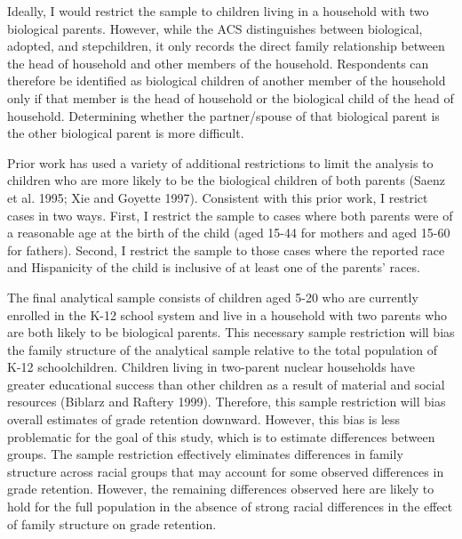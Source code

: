 \documentclass[
  letterpaper,
  DIV=11,
  numbers=noendperiod]{scrartcl}
\begin{document}
Ideally, I would restrict the sample to children living in a household
with two biological parents. However, while the ACS distinguishes
between biological, adopted, and stepchildren, it only records the
direct family relationship between the head of household and other
members of the household. Respondents can therefore be identified as
biological children of another member of the household only if that
member is the head of household or the biological child of the head of
household. Determining whether the partner/spouse of that biological
parent is the other biological parent is more difficult.

Prior work has used a variety of additional restrictions to limit the
analysis to children who are more likely to be the biological children
of both parents (Saenz et al. 1995; Xie and Goyette 1997). Consistent
with this prior work, I restrict cases in two ways. First, I restrict
the sample to cases where both parents were of a reasonable age at the
birth of the child (aged 15-44 for mothers and aged 15-60 for fathers).
Second, I restrict the sample to those cases where the reported race and
Hispanicity of the child is inclusive of at least one of the parents'
races.

The final analytical sample consists of children aged 5-20 who are
currently enrolled in the K-12 school system and live in a household
with two parents who are both likely to be biological parents. This
necessary sample restriction will bias the family structure of the
analytical sample relative to the total population of K-12
schoolchildren. Children living in two-parent nuclear households have
greater educational success than other children as a result of material
and social resources (Biblarz and Raftery 1999). Therefore, this sample
restriction will bias overall estimates of grade retention downward.
However, this bias is less problematic for the goal of this study, which
is to estimate differences between groups. The sample restriction
effectively eliminates differences in family structure across racial
groups that may account for some observed differences in grade
retention. However, the remaining differences observed here are likely
to hold for the full population in the absence of strong racial
differences in the effect of family structure on grade retention.
\end{document}
